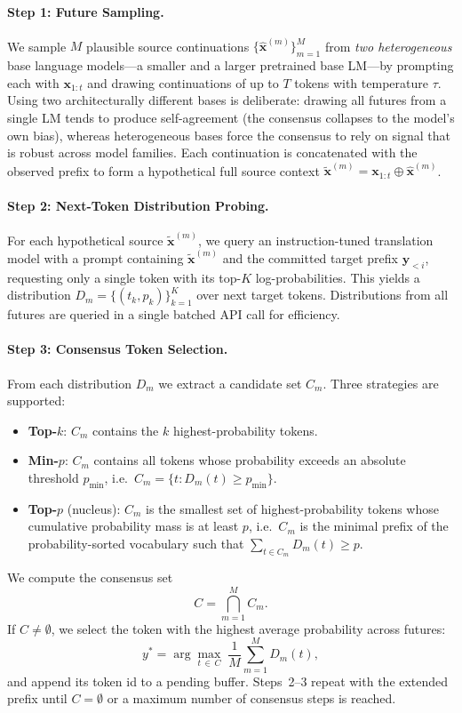 \paragraph{Step 1: Future Sampling.}
We sample $M$ plausible source continuations
$\{\hat{\mathbf{x}}^{(m)}\}_{m=1}^{M}$ from \emph{two heterogeneous} base
language models---a smaller and a larger pretrained base LM---by prompting
each with $\mathbf{x}_{1:t}$ and drawing continuations of up to $T$ tokens
with temperature $\tau$. Using two architecturally different bases is
deliberate: drawing all futures from a single LM tends to produce
self-agreement (the consensus collapses to the model's own bias), whereas
heterogeneous bases force the consensus to rely on signal that is robust
across model families. Each continuation is concatenated with the observed
prefix to form a hypothetical full source context
$\tilde{\mathbf{x}}^{(m)} = \mathbf{x}_{1:t} \oplus \hat{\mathbf{x}}^{(m)}$.

\paragraph{Step 2: Next-Token Distribution Probing.}
For each hypothetical source $\tilde{\mathbf{x}}^{(m)}$, we query an
instruction-tuned translation model with a prompt containing
$\tilde{\mathbf{x}}^{(m)}$ and the committed target prefix
$\mathbf{y}_{<i}$, requesting only a single token with its top-$K$
log-probabilities. This yields a distribution
$D_m = \{(t_k, p_k)\}_{k=1}^{K}$ over next target tokens. Distributions
from all futures are queried in a single batched API call for efficiency.

\paragraph{Step 3: Consensus Token Selection.}
From each distribution $D_m$ we extract a candidate set $C_m$. Three
strategies are supported:
\begin{itemize}
\item \textbf{Top-$k$}: $C_m$ contains the $k$ highest-probability tokens.
\item \textbf{Min-$p$}: $C_m$ contains all tokens whose probability exceeds
      an absolute threshold $p_{\min}$, i.e.\
      $C_m = \{t : D_m(t) \ge p_{\min}\}$.
\item \textbf{Top-$p$} (nucleus): $C_m$ is the smallest set of
      highest-probability tokens whose cumulative probability mass is at
      least $p$, i.e.\ $C_m$ is the minimal prefix of the probability-sorted
      vocabulary such that $\sum_{t \in C_m} D_m(t) \ge p$.
\end{itemize}
We compute the consensus set
\begin{equation}
C = \bigcap_{m=1}^{M} C_m.
\end{equation}
If $C \neq \emptyset$, we select the token with the highest average
probability across futures:
\begin{equation}
y^* = \arg\max_{t \,\in\, C} \; \frac{1}{M} \sum_{m=1}^{M} D_m(t),
\end{equation}
and append its token id to a pending buffer. Steps~2--3 repeat with the
extended prefix until $C = \emptyset$ or a maximum number of consensus steps
is reached.

